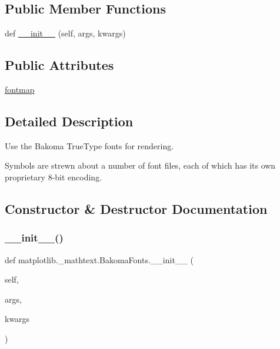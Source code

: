 \subsection*{Public Member Functions}
\begin{DoxyCompactItemize}
\item 
def \hyperlink{classmatplotlib_1_1__mathtext_1_1BakomaFonts_a8beca248878b3a960080e9d322f3e3b7}{\+\_\+\+\_\+init\+\_\+\+\_\+} (self, args, kwargs)
\end{DoxyCompactItemize}
\subsection*{Public Attributes}
\begin{DoxyCompactItemize}
\item 
\hyperlink{classmatplotlib_1_1__mathtext_1_1BakomaFonts_a6ff3c9fd4af0e1927d3c576eed588b27}{fontmap}
\end{DoxyCompactItemize}


\subsection{Detailed Description}
\begin{DoxyVerb}Use the Bakoma TrueType fonts for rendering.

Symbols are strewn about a number of font files, each of which has
its own proprietary 8-bit encoding.
\end{DoxyVerb}
 

\subsection{Constructor \& Destructor Documentation}
\mbox{\label{classmatplotlib_1_1__mathtext_1_1BakomaFonts_a8beca248878b3a960080e9d322f3e3b7}} 
\subsubsection{\texorpdfstring{\+\_\+\+\_\+init\+\_\+\+\_\+()}{\_\_init\_\_()}}
{\footnotesize\ttfamily def matplotlib.\+\_\+mathtext.\+Bakoma\+Fonts.\+\_\+\+\_\+init\+\_\+\+\_\+ (\begin{DoxyParamCaption}\item[{}]{self,  }\item[{}]{args,  }\item[{}]{kwargs }\end{DoxyParamCaption})}



